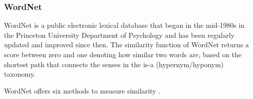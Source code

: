 \documentclass{article}
\begin{document}
\subsubsection{WordNet}
WordNet is a public electronic lexical database that began in the mid-1980s in the Princeton University Department of Psychology and has been regularly updated and improved since then. The similarity function of WordNet returns a score between zero and one denoting how similar two words are, based on the shortest path that connects the senses in the is-a (hypernym/hyponym) taxonomy. %

WordNet offers six methods to measure similarity \citep{pedersen2004wordnet}. %
\end{document}
